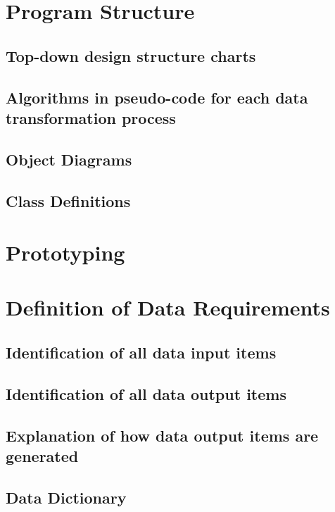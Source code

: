 \begin{itemize}
\section{Program Structure}


\subsection{Top-down design structure charts}

\subsection{Algorithms in pseudo-code for each data transformation process}

\subsection{Object Diagrams}

\subsection{Class Definitions}

\section{Prototyping}

\section{Definition of Data Requirements}

\subsection{Identification of all data input items}

\subsection{Identification of all data output items}

\subsection{Explanation of how data output items are generated}

\subsection{Data Dictionary}


\end{itemize}
